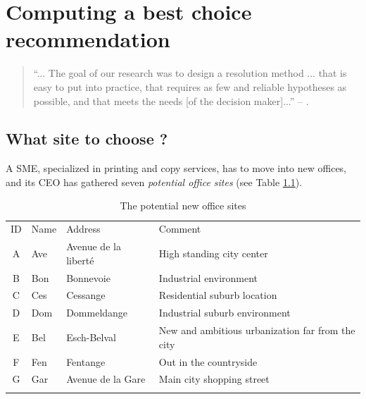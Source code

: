 \chapter{Computing a best choice recommendation}
\label{sec:6}

\begin{quotation}
“... The goal of our research was to design a resolution method ... that is easy to
put into practice, that requires as few and reliable hypotheses as possible, and that
meets the needs [of the decision maker]...” -- \citep{ROY-1966}.
\end{quotation}



\section{What site to choose ?}
\label{sec:6.1}

A SME, specialized in printing and copy services, has to move into new offices, and its CEO has gathered seven \emph{potential office sites} (see Table \ref{tab:6.1}).
\begin{table}[h]
\caption{The potential new office sites}
\label{tab:6.1}       %
\begin{center}
    \begin{tabular}{c|l|l|l}
      \svhline\noalign{\smallskip}
      ID & Name & Address & Comment\\
      \noalign{\smallskip}\hline\noalign{\smallskip}
    A &   Ave  &  Avenue de la liberté &  High standing city center\\
    B &   Bon  &  Bonnevoie &             Industrial environment\\
    C &   Ces  &  Cessange &              Residential suburb location\\
    D &   Dom  &  Dommeldange &           Industrial suburb environment\\
    E &   Bel  &  Esch-Belval &           New and ambitious urbanization far from the city\\
    F &   Fen  &  Fentange &              Out in the countryside\\
      G &   Gar  &  Avenue de la Gare &     Main city shopping street\\
      \noalign{\smallskip}\hline
    \end{tabular}
\end{center}
\end{table}

